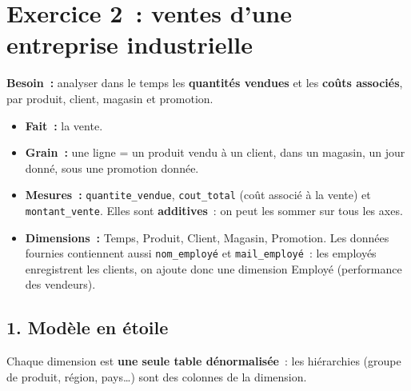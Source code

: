 \newpage
\section*{Exercice 2~: ventes d'une entreprise industrielle}

\noindent \textbf{Besoin~:} analyser dans le temps les \textbf{quantités vendues} et les \textbf{coûts associés}, par produit, client, magasin et promotion.

\begin{itemize}
	\item \textbf{Fait~:} la vente.
	\item \textbf{Grain~:} une ligne = un produit vendu à un client, dans un magasin, un jour donné, sous une promotion donnée.
	\item \textbf{Mesures~:} \texttt{quantite\_vendue}, \texttt{cout\_total} (coût associé à la vente) et \texttt{montant\_vente}. Elles sont \textbf{additives}~: on peut les sommer sur tous les axes.
	\item \textbf{Dimensions~:} Temps, Produit, Client, Magasin, Promotion. Les données fournies contiennent aussi \texttt{nom\_employé} et \texttt{mail\_employé}~: les employés enregistrent les clients, on ajoute donc une dimension Employé (performance des vendeurs).
\end{itemize}

\newpage
\subsection*{1. Modèle en étoile}
{}

\noindent Chaque dimension est \textbf{une seule table dénormalisée}~: les hiérarchies (groupe de produit, région, pays\dots) sont des colonnes de la dimension.

